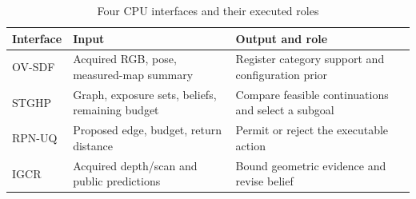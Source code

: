 \begin{table}[!htbp]
\caption{Four CPU interfaces and their executed roles}\label{tab:1}
\small\setlength{\tabcolsep}{3pt}
\setlength{\JournalTableWidth}{\dimexpr\linewidth-4\tabcolsep\relax}
\begin{tabular}{@{}>{\raggedright\arraybackslash}p{0.16\JournalTableWidth} >{\raggedright\arraybackslash}p{0.32\JournalTableWidth} >{\raggedright\arraybackslash}p{0.52\JournalTableWidth}@{}}
\toprule
Interface & Input & Output and role \\
\midrule
OV-SDF & Acquired RGB, pose, measured-map summary & Register category support and configuration prior \\
STGHP & Graph, exposure sets, beliefs, remaining budget & Compare feasible continuations and select a subgoal \\
RPN-UQ & Proposed edge, budget, return distance & Permit or reject the executable action \\
IGCR & Acquired depth/scan and public predictions & Bound geometric evidence and revise belief \\
\bottomrule
\end{tabular}
\end{table}
